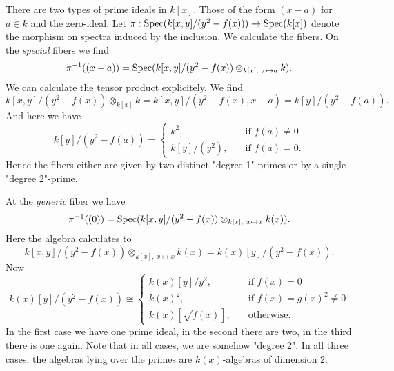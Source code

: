 \documentclass[a4paper,11pt]{article}
\begin{document}
There are two types of prime ideals in $k[x]$. Those of the form $(x-a)$
for $a \in k$ and the zero-ideal. Let $\pi: \operatorname{Spec}(k[x,y]/(y^2-f(x))) \to
\operatorname{Spec}(k[x])$ denote the morphism on spectra induced by the inclusion. We
calculate the fibers. On the \textit{special} fibers we find
\begin{equation*}
    \pi^{-1}((x-a)) = \operatorname{Spec}(k[x,y]/(y^2-f(x)) \otimes_{k[x],\ x \mapsto a} k).
\end{equation*}
We can calculate the tensor product explicitely. We find
\begin{equation*}
    k[x,y]/(y^2 - f(x)) \otimes_{k[x]} k = k[x,y]/(y^2-f(x), x-a) = 
    k[y]/(y^2-f(a)).
\end{equation*}
And here we have
\begin{equation*}
    k[y]/(y^2-f(a)) = 
    \begin{cases}
        k^2, \quad &\text{if }f(a) \neq 0\\
        k[y]/(y^2), \quad &\text{if } f(a) = 0.
    \end{cases}
\end{equation*}
Hence the fibers either are given by two distinct "degree 1"-primes or by a 
single "degree 2"-prime.

At the \textit{generic} fiber we have 
\begin{equation*}
    \pi^{-1}((0)) = \operatorname{Spec}(k[x,y]/(y^2-f(x)) \otimes_{k[x],\ x \mapsto x} k(x)).
\end{equation*}
Here the algebra calculates to
\begin{equation*}
    k[x,y]/(y^2-f(x)) \otimes_{k[x],\ x \mapsto x} k(x) = k(x)[y]/(y^2-f(x)).
\end{equation*}
Now
\begin{equation*}
    k(x)[y] / (y^2 - f(x)) \cong \begin{cases}
        k(x)[y]/y^2, \quad &\text{if } f(x) = 0 \\
        k(x)^2, \quad &\text{if } f(x) = g(x)^2 \neq 0\\
        k(x)[\sqrt {f(x)}], \quad &\text{otherwise}.
    \end{cases}
\end{equation*}
In the first case we have one prime ideal, in the second there are two, 
in the third there is one again. Note that in all cases, we are somehow
"degree 2". In all three cases, the algebras lying over the primes
are $k(x)$-algebras of dimension 2.
\end{document}
